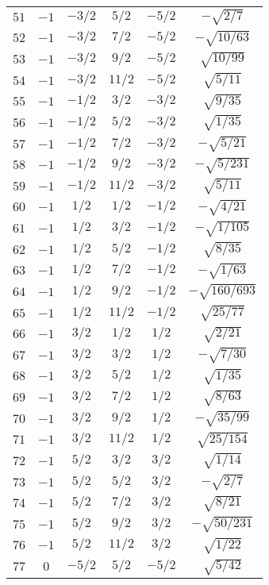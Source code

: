 \begin{table}
\begin{center}
\begin{tabular}{|c|c|c|c|c|c|}
$51$ & $-1$ & $-3/2$ & $5/2$ & $-5/2$ & $-\sqrt{2/7}$ \\ 
$52$ & $-1$ & $-3/2$ & $7/2$ & $-5/2$ & $-\sqrt{10/63}$ \\ 
$53$ & $-1$ & $-3/2$ & $9/2$ & $-5/2$ & $\sqrt{10/99}$ \\ 
$54$ & $-1$ & $-3/2$ & $11/2$ & $-5/2$ & $\sqrt{5/11}$ \\ 
$55$ & $-1$ & $-1/2$ & $3/2$ & $-3/2$ & $\sqrt{9/35}$ \\ 
$56$ & $-1$ & $-1/2$ & $5/2$ & $-3/2$ & $\sqrt{1/35}$ \\ 
$57$ & $-1$ & $-1/2$ & $7/2$ & $-3/2$ & $-\sqrt{5/21}$ \\ 
$58$ & $-1$ & $-1/2$ & $9/2$ & $-3/2$ & $-\sqrt{5/231}$ \\ 
$59$ & $-1$ & $-1/2$ & $11/2$ & $-3/2$ & $\sqrt{5/11}$ \\ 
$60$ & $-1$ & $1/2$ & $1/2$ & $-1/2$ & $-\sqrt{4/21}$ \\ 
$61$ & $-1$ & $1/2$ & $3/2$ & $-1/2$ & $-\sqrt{1/105}$ \\ 
$62$ & $-1$ & $1/2$ & $5/2$ & $-1/2$ & $\sqrt{8/35}$ \\ 
$63$ & $-1$ & $1/2$ & $7/2$ & $-1/2$ & $-\sqrt{1/63}$ \\ 
$64$ & $-1$ & $1/2$ & $9/2$ & $-1/2$ & $-\sqrt{160/693}$ \\ 
$65$ & $-1$ & $1/2$ & $11/2$ & $-1/2$ & $\sqrt{25/77}$ \\ 
$66$ & $-1$ & $3/2$ & $1/2$ & $1/2$ & $\sqrt{2/21}$ \\ 
$67$ & $-1$ & $3/2$ & $3/2$ & $1/2$ & $-\sqrt{7/30}$ \\ 
$68$ & $-1$ & $3/2$ & $5/2$ & $1/2$ & $\sqrt{1/35}$ \\ 
$69$ & $-1$ & $3/2$ & $7/2$ & $1/2$ & $\sqrt{8/63}$ \\ 
$70$ & $-1$ & $3/2$ & $9/2$ & $1/2$ & $-\sqrt{35/99}$ \\ 
$71$ & $-1$ & $3/2$ & $11/2$ & $1/2$ & $\sqrt{25/154}$ \\ 
$72$ & $-1$ & $5/2$ & $3/2$ & $3/2$ & $\sqrt{1/14}$ \\ 
$73$ & $-1$ & $5/2$ & $5/2$ & $3/2$ & $-\sqrt{2/7}$ \\ 
$74$ & $-1$ & $5/2$ & $7/2$ & $3/2$ & $\sqrt{8/21}$ \\ 
$75$ & $-1$ & $5/2$ & $9/2$ & $3/2$ & $-\sqrt{50/231}$ \\ 
$76$ & $-1$ & $5/2$ & $11/2$ & $3/2$ & $\sqrt{1/22}$ \\ 
$77$ & $0$ & $-5/2$ & $5/2$ & $-5/2$ & $\sqrt{5/42}$ \\ 

\end{tabular}
\end{center}
\end{table}
